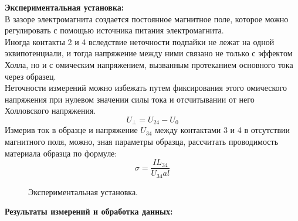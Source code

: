 \documentclass[a4paper, 12pt]{article}%
\begin{document}
	\textbf{Экспериментальная установка: }\\
	В зазоре электромагнита создается постоянное магнитное поле, которое можно регулировать с помощью источника питания электромагнита.\\
	Иногда контакты 2 и 4 вследствие неточности подпайки не лежат на одной эквипотенциали, и тогда напряжение между ними связано не только с эффектом Холла, но и с омическим напряжением, вызванным протеканием основного тока через образец. \\
	Неточности измерений можно избежать путем фиксирования этого омического напряжения при нулевом значении силы тока и отсчитывании от него Холловского напряжения. 
	\[U_\perp = U_{24} - U_0\]
	Измерив ток в образце и напряжение $U_{34}$ между контактами 3 и 4 в отсутствии магнитного поля, можно, зная параметры образца, рассчитать проводимость материала образца по формуле:
	\begin{equation}
		\sigma = \dfrac{I L_{34}}{U_{34}al}
	\end{equation}
	\begin{figure}[H]
		\caption{Экспериментальная установка.}
	\end{figure}
	
	
	\newpage
	
	\textbf{Результаты измерений и обработка данных: }\\
	
\end{document}
